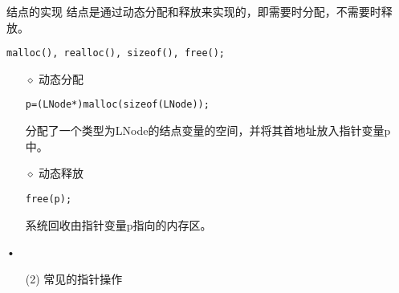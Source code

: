 \begin{frame}[fragile]\ft{\subsecname}
\begin{block}{结点的实现}
结点是通过动态分配和释放来实现的，即需要时分配，不需要时释放。
\begin{lstlisting}[frame=no,backgroundcolor=\color{red!0!green!0!blue!0}]
malloc(), realloc(), sizeof(), free();
\end{lstlisting}
\pause 
\begin{itemize}
\item[$\diamond$]
动态分配
\begin{lstlisting}[frame=no,backgroundcolor=\color{red!0!green!0!blue!0}]
p=(LNode*)malloc(sizeof(LNode));
\end{lstlisting}
分配了一个类型为LNode的结点变量的空间，并将其首地址放入指针变量p中。\\[0.1in]
\item[$\diamond$]
动态释放
\begin{lstlisting}[frame=no,backgroundcolor=\color{red!0!green!0!blue!0}]
free(p);
\end{lstlisting}
系统回收由指针变量p指向的内存区。
\end{itemize}•
\end{block}
\end{frame}

 


\begin{frame}[fragile]
\begin{itemize}
\item[(2)] 常见的指针操作

\pause 


\end{itemize}
 
\end{frame}

\begin{frame}[fragile]

\pause 


 
 
\end{frame}


